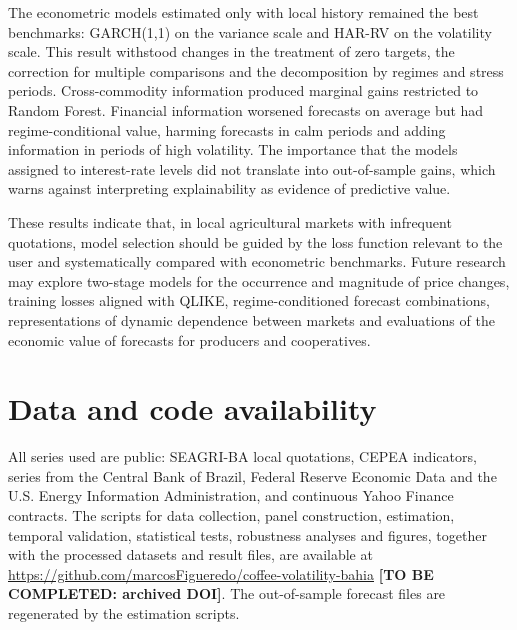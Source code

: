 \documentclass[a4paper,fleqn]{cas-sc}
\begin{document}
The econometric models estimated only with local history remained the best benchmarks: GARCH(1,1) on the variance scale and HAR-RV on the volatility scale. This result withstood changes in the treatment of zero targets, the correction for multiple comparisons and the decomposition by regimes and stress periods. Cross-commodity information produced marginal gains restricted to Random Forest. Financial information worsened forecasts on average but had regime-conditional value, harming forecasts in calm periods and adding information in periods of high volatility. The importance that the models assigned to interest-rate levels did not translate into out-of-sample gains, which warns against interpreting explainability as evidence of predictive value.

These results indicate that, in local agricultural markets with infrequent quotations, model selection should be guided by the loss function relevant to the user and systematically compared with econometric benchmarks. Future research may explore two-stage models for the occurrence and magnitude of price changes, training losses aligned with QLIKE, regime-conditioned forecast combinations, representations of dynamic dependence between markets and evaluations of the economic value of forecasts for producers and cooperatives.




\section*{Data and code availability}
All series used are public: SEAGRI-BA local quotations, CEPEA indicators, series from the Central Bank of Brazil, Federal Reserve Economic Data and the U.S. Energy Information Administration, and continuous Yahoo Finance contracts. The scripts for data collection, panel construction, estimation, temporal validation, statistical tests, robustness analyses and figures, together with the processed datasets and result files, are available at \url{https://github.com/marcosFigueredo/coffee-volatility-bahia} \textbf{[TO BE COMPLETED: archived DOI]}. The out-of-sample forecast files are regenerated by the estimation scripts.
\end{document}
